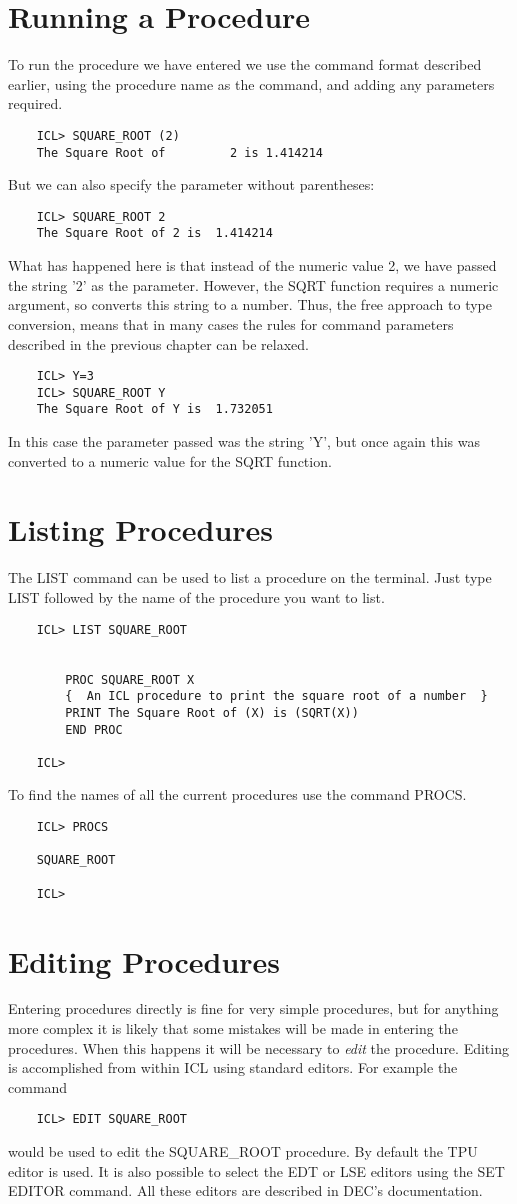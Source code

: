 \section{Running a Procedure}
To run the procedure we have entered we use the command format described
earlier, using the procedure name as the command, and adding any parameters
required.
\begin{verbatim}
    ICL> SQUARE_ROOT (2)
    The Square Root of         2 is 1.414214
\end{verbatim}
But we can also specify the parameter without parentheses:
\begin{verbatim}
    ICL> SQUARE_ROOT 2
    The Square Root of 2 is  1.414214
\end{verbatim}
What has happened here is that instead of the numeric value 2, we have
passed the string '2' as the parameter. However, the SQRT function requires
a numeric argument, so converts this string to a number. Thus, the free
approach to type conversion, means that in many cases the rules for command
parameters described in the previous chapter can be relaxed.
\begin{verbatim}
    ICL> Y=3
    ICL> SQUARE_ROOT Y
    The Square Root of Y is  1.732051
\end{verbatim}
In this case the parameter passed was the string 'Y', but once again this
was converted to a numeric value for the SQRT function.
\section{Listing Procedures}
The LIST command can be used to list a procedure on the terminal. Just type
LIST followed by the name of the procedure you want to list.
\begin{verbatim}
    ICL> LIST SQUARE_ROOT


        PROC SQUARE_ROOT X
        {  An ICL procedure to print the square root of a number  }
        PRINT The Square Root of (X) is (SQRT(X))
        END PROC

    ICL>
\end{verbatim}
To find the names of all the current procedures use the command PROCS.
\begin{verbatim}
    ICL> PROCS

    SQUARE_ROOT

    ICL> 
\end{verbatim}
\section{Editing Procedures}
Entering procedures directly is fine for very simple procedures, but for
anything more complex it is likely that some mistakes will be made in
entering the procedures. When this happens it will be necessary to 
{\em edit} the procedure. Editing is accomplished from within ICL using
standard editors. 
For example the command
\begin{verbatim}
    ICL> EDIT SQUARE_ROOT
\end{verbatim}
would be used to edit the SQUARE\_ROOT procedure. By default the TPU editor
is used. It is also possible to select the EDT or LSE editors using the 
SET EDITOR command. All these editors are described in DEC's documentation.

